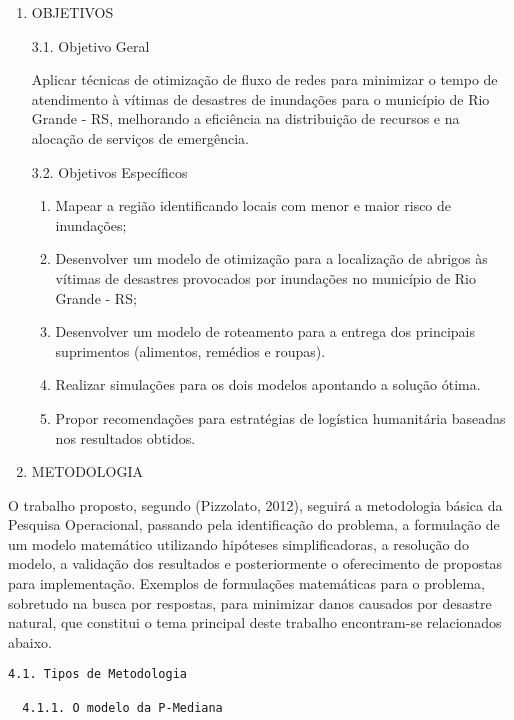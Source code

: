 \documentclass[
]{article}
\begin{document}
\begin{enumerate}
\def\labelenumi{\arabic{enumi}.}
\setcounter{enumi}{2}
\item
  OBJETIVOS

  3.1. Objetivo Geral

  Aplicar técnicas de otimização de fluxo de redes para minimizar o
  tempo de atendimento à vítimas de desastres de inundações para o
  município de Rio Grande - RS, melhorando a eficiência na distribuição
  de recursos e na alocação de serviços de emergência.

  3.2. Objetivos Específicos

  \begin{enumerate}
  \def\labelenumii{\arabic{enumii}.}
  \item
    Mapear a região identificando locais com menor e maior risco de
    inundações;
  \item
    Desenvolver um modelo de otimização para a localização de abrigos às
    vítimas de desastres provocados por inundações no município de Rio
    Grande - RS;
  \item
    Desenvolver um modelo de roteamento para a entrega dos principais
    suprimentos (alimentos, remédios e roupas).
  \item
    Realizar simulações para os dois modelos apontando a solução ótima.
  \item
    Propor recomendações para estratégias de logística humanitária
    baseadas nos resultados obtidos.
  \end{enumerate}
\item
  METODOLOGIA
\end{enumerate}

O trabalho proposto, segundo (Pizzolato, 2012), seguirá a metodologia
básica da Pesquisa Operacional, passando pela identificação do problema,
a formulação de um modelo matemático utilizando hipóteses
simplificadoras, a resolução do modelo, a validação dos resultados e
posteriormente o oferecimento de propostas para implementação. Exemplos
de formulações matemáticas para o problema, sobretudo na busca por
respostas, para minimizar danos causados por desastre natural, que
constitui o tema principal deste trabalho encontram-se relacionados
abaixo.

\begin{verbatim}
4.1. Tipos de Metodologia

  4.1.1. O modelo da P-Mediana
\end{verbatim}
\end{document}
